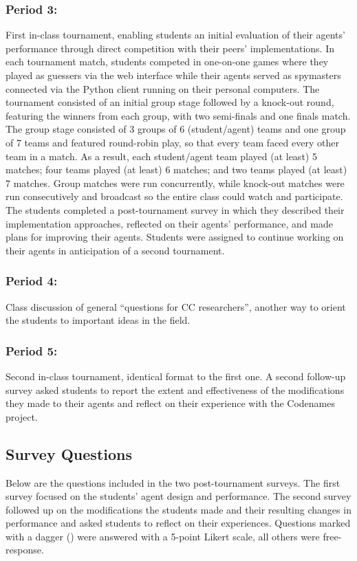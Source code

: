 \documentclass[phd,electronic,oneside,twosidetoc,letterpaper,chaptercenter,parttop,lof]{byumsphd}
\begin{document}
\subsubsection{Period 3:} First in-class tournament, enabling students an initial evaluation of their agents' performance through direct competition with their peers' implementations. In each tournament match, students competed in one-on-one games where they played as guessers via the web interface while their agents served as spymasters connected via the Python client running on their personal computers. The tournament consisted of an initial group stage followed by a knock-out round, featuring the winners from each group, with two semi-finals and one finals match.  The group stage consisted of  3 groups of 6 (student/agent) teams and one group of 7 teams and featured round-robin play, so that every team faced every other team in a match.  As a result, each student/agent team played (at least) 5 matches; four teams played (at least) 6 matches; and two teams played (at least) 7 matches.  Group matches were run concurrently, while knock-out matches were run consecutively and broadcast so the entire class could watch and participate. The students completed a post-tournament survey in which they described their implementation approaches, reflected on their agents’ performance, and made plans for improving their agents. Students were assigned to continue working on their agents in anticipation of a second tournament.

\subsubsection{Period 4:} Class discussion of general “questions for CC researchers”, another way to orient the students to important ideas in the field.

\subsubsection{Period 5:} Second in-class tournament, identical format to the first one. A second follow-up survey asked students to report the extent and effectiveness of the modifications they made to their agents and reflect on their experience with the Codenames project.

\subsection{Survey Questions}
Below are the questions included in the two post-tournament surveys. The first survey focused on the students’ agent design and performance. The second survey followed up on the modifications the students made and their resulting changes in performance and asked students to reflect on their experiences. Questions marked with a dagger (\textdagger) were answered with a 5-point Likert scale, all others were free-response.
\end{document}
